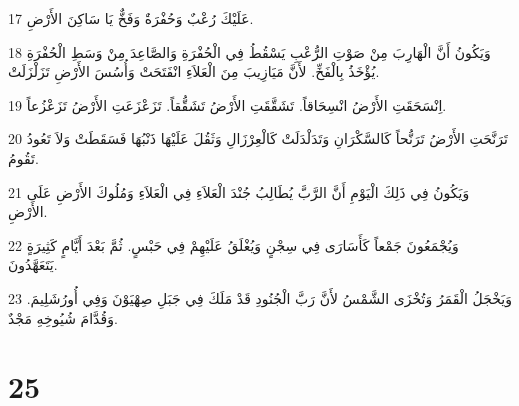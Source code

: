 \par 17 عَلَيْكَ رُعْبٌ وَحُفْرَةٌ وَفَخٌّ يَا سَاكِنَ الأَرْضِ.
\par 18 وَيَكُونُ أَنَّ الْهَارِبَ مِنْ صَوْتِ الرُّعْبِ يَسْقُطُ فِي الْحُفْرَةِ وَالصَّاعِدَ مِنْ وَسَطِ الْحُفْرَةِ يُؤْخَذُ بِالْفَخِّ. لأَنَّ مَيَازِيبَ مِنَ الْعَلاَءِ انْفَتَحَتْ وَأُسُسَ الأَرْضِ تَزَلْزَلَتْ.
\par 19 اِنْسَحَقَتِ الأَرْضُ انْسِحَاقاً. تَشَقَّقَتِ الأَرْضُ تَشَقُّقاً. تَزَعْزَعَتِ الأَرْضُ تَزَعْزُعاً.
\par 20 تَرَنَّحَتِ الأَرْضُ تَرَنُّحاً كَالسَّكْرَانِ وَتَدَلْدَلَتْ كَالْعِرْزَالِ وَثَقُلَ عَلَيْهَا ذَنْبُهَا فَسَقَطَتْ وَلاَ تَعُودُ تَقُومُ.
\par 21 وَيَكُونُ فِي ذَلِكَ الْيَوْمِ أَنَّ الرَّبَّ يُطَالِبُ جُنْدَ الْعَلاَءِ فِي الْعَلاَءِ وَمُلُوكَ الأَرْضِ عَلَى الأَرْضِ.
\par 22 وَيُجْمَعُونَ جَمْعاً كَأَسَارَى فِي سِجْنٍ وَيُغْلَقُ عَلَيْهِمْ فِي حَبْسٍ. ثُمَّ بَعْدَ أَيَّامٍ كَثِيرَةٍ يَتَعَهَّدُونَ.
\par 23 وَيَخْجَلُ الْقَمَرُ وَتُخْزَى الشَّمْسُ لأَنَّ رَبَّ الْجُنُودِ قَدْ مَلَكَ فِي جَبَلِ صِهْيَوْنَ وَفِي أُورُشَلِيمَ. وَقُدَّامَ شُيُوخِهِ مَجْدٌ.

\chapter{25}

